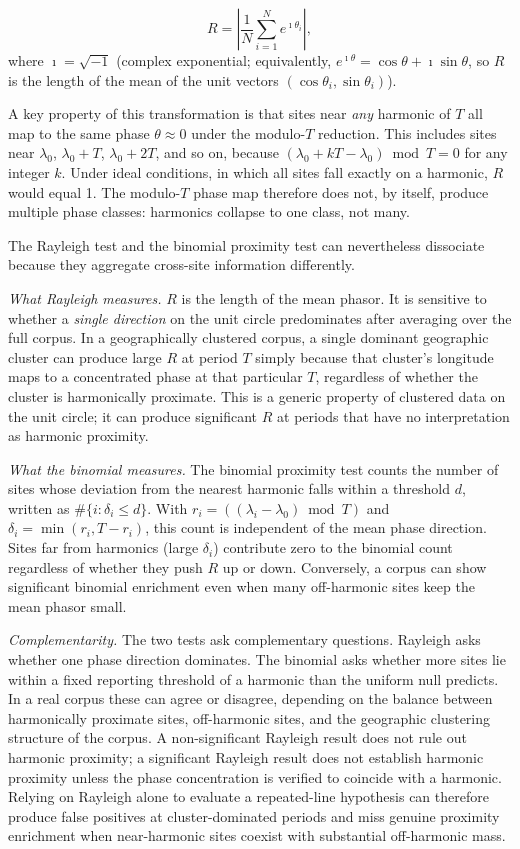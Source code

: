 \documentclass[12pt,a4paper]{article}
\begin{document}
\[
R = \left| \frac{1}{N} \sum_{i=1}^{N} e^{\imath\theta_i} \right|,
\]
where $\imath = \sqrt{-1}$ (complex exponential; equivalently,
$e^{\imath\theta} = \cos\theta + \imath\sin\theta$, so $R$ is the length of the
mean of the unit vectors $(\cos\theta_i, \sin\theta_i)$).

A key property of this transformation is that sites near \emph{any}
harmonic of $T$ all map to the same phase $\theta \approx 0$ under the
modulo-$T$ reduction. This includes sites near $\lambda_0$,
$\lambda_0 + T$, $\lambda_0 + 2T$, and so on, because
$(\lambda_0 + kT - \lambda_0) \bmod T = 0$ for any integer $k$.
Under ideal conditions, in which all sites fall exactly on a harmonic,
$R$ would equal 1. The modulo-$T$ phase map therefore does not, by
itself, produce multiple phase classes: harmonics collapse to one class,
not many.

The Rayleigh test and the binomial proximity test can nevertheless
dissociate because they aggregate cross-site information differently.

\emph{What Rayleigh measures.} $R$ is the length of the mean phasor. It
is sensitive to whether a \emph{single direction} on the unit circle
predominates after averaging over the full corpus. In a geographically
clustered corpus, a single dominant geographic cluster can produce
large $R$ at period $T$ simply because that cluster's longitude maps to
a concentrated phase at that particular $T$, regardless of whether the
cluster is harmonically proximate. This is a generic property of
clustered data on the unit circle; it can produce significant $R$ at
periods that have no interpretation as harmonic proximity.

\emph{What the binomial measures.} The binomial proximity test counts
the number of sites whose deviation from the nearest harmonic falls
within a threshold $d$, written as $\#\{i : \delta_i \leq d\}$. With
$r_i = ((\lambda_i - \lambda_0) \bmod T)$ and
$\delta_i = \min(r_i, T - r_i)$, this count is independent of the mean
phase direction. Sites far from
harmonics (large $\delta_i$) contribute zero to the binomial count
regardless of whether they push $R$ up or down. Conversely, a corpus
can show significant binomial enrichment even when many off-harmonic
sites keep the mean phasor small.

\emph{Complementarity.} The two tests ask complementary questions.
Rayleigh asks whether one phase direction dominates. The binomial asks
whether more sites lie within a fixed reporting threshold of a harmonic
than the uniform null predicts. In a real corpus these can agree or disagree,
depending on the balance between harmonically proximate sites,
off-harmonic sites, and the geographic clustering structure of the
corpus. A non-significant Rayleigh result does not rule out harmonic
proximity; a significant Rayleigh result does not establish harmonic
proximity unless the phase concentration is verified to coincide with
a harmonic. Relying on Rayleigh alone to evaluate a repeated-line
hypothesis can therefore produce false positives at cluster-dominated
periods and miss genuine proximity enrichment when near-harmonic sites
coexist with substantial off-harmonic mass.
\end{document}
